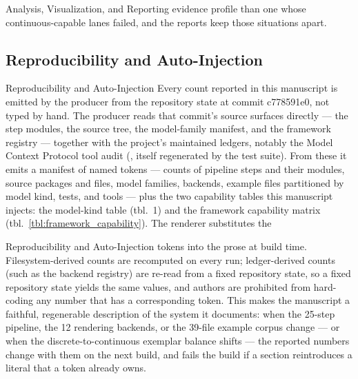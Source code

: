 \documentclass[
  ignorenonframetext,
]{beamer}
\begin{document}
\begin{frame}{Analysis, Visualization, and
Reporting}
evidence profile than one whose continuous-capable lanes failed, and the
reports keep those situations apart.
\end{frame}

\subsection{Reproducibility and
Auto-Injection}\label{reproducibility-and-auto-injection}

\begin{frame}{Reproducibility and
Auto-Injection}
Every count reported in this manuscript is emitted by the producer
 from the
repository state at commit c778591e0, not typed by hand. The producer
reads that commit's source surfaces directly --- the step modules, the
source tree, the model-family manifest, and the framework registry ---
together with the project's maintained ledgers, notably the Model
Context Protocol tool audit (,
itself regenerated by the test suite). From these it emits a manifest of
named tokens --- counts of pipeline steps and their modules, source
packages and files, model families, backends, example files partitioned
by model kind, tests, and tools --- plus the two capability tables this
manuscript injects: the model-kind table (tbl.~1)
and the framework capability matrix
(tbl.~\ref{tbl:framework_capability}). The renderer substitutes the
\end{frame}

\begin{frame}{Reproducibility and
Auto-Injection}
tokens into the prose at build time. Filesystem-derived counts are
recomputed on every run; ledger-derived counts (such as the backend
registry) are re-read from a fixed repository state, so a fixed
repository state yields the same values, and authors are prohibited from
hard-coding any number that has a corresponding token. This makes the
manuscript a faithful, regenerable description of the system it
documents: when the 25-step pipeline, the 12 rendering backends, or the
39-file example corpus change --- or when the discrete-to-continuous
exemplar balance shifts --- the reported numbers change with them on the
next build, and  fails the
build if a section reintroduces a literal that a token already owns.
\end{frame}
\end{document}
